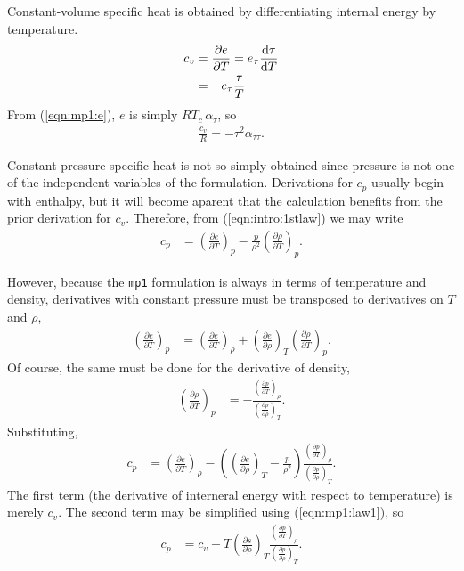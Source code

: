Constant-volume specific heat is obtained by differentiating internal energy by temperature.
\begin{align*}
c_v &= \frac{\partial e}{\partial T} = e_\tau \frac{\mathrm{d} \tau}{\mathrm{d} T}\\
 &= -e_\tau \frac{\tau}{T}
\end{align*}
From (\ref{eqn:mp1:e}), $e$ is simply $R T_c \, \alpha_\tau$, so
\begin{align}
\frac{c_v}{R} = - \tau^2 \alpha_{\tau\tau}\label{eqn:mp1:cv}.
\end{align}

Constant-pressure specific heat is not so simply obtained since pressure is not one of the independent variables of the formulation.  Derivations for $c_p$ usually begin with enthalpy, but it will become aparent that the calculation benefits from the prior derivation for $c_v$.  Therefore, from (\ref{eqn:intro:1stlaw}) we may write
\begin{align*}
c_p &= \left(\frac{\partial e}{\partial T}\right)_p - \frac{p}{\rho^2} \left(\frac{\partial \rho}{\partial T}\right)_p.
\end{align*}

However, because the \texttt{mp1} formulation is always in terms of temperature and density, derivatives with constant pressure must be transposed to derivatives on $T$ and $\rho$, 
\begin{align*}
\left(\frac{\partial e}{\partial T}\right)_p &=  \left(\frac{\partial e}{\partial T}\right)_\rho +  \left(\frac{\partial e}{\partial \rho}\right)_T  \left(\frac{\partial \rho}{\partial T}\right)_p.
\end{align*}
Of course, the same must be done for the derivative of density,
\begin{align*}
\left(\frac{\partial \rho}{\partial T}\right)_p &= -\frac{ \left(\frac{\partial p}{\partial T}\right)_\rho }{ \left(\frac{\partial p}{\partial \rho}\right)_T }.
\end{align*}
Substituting,
\begin{align*}
c_p &= \left(\frac{\partial e}{\partial T}\right)_\rho - \left(\left(\frac{\partial e}{\partial \rho}\right)_T - \frac{p}{\rho^2}\right) \frac{ \left(\frac{\partial p}{\partial T}\right)_\rho }{ \left(\frac{\partial p}{\partial \rho}\right)_T }.
\end{align*}
The first term (the derivative of interneral energy with respect to temperature) is merely $c_v$.  The second term may be simplified using (\ref{eqn:mp1:law1}), so
\begin{align*}
c_p &= c_v - T\left(\frac{\partial s}{\partial \rho}\right)_T \frac{ \left(\frac{\partial p}{\partial T}\right)_\rho }{ \left(\frac{\partial p}{\partial \rho}\right)_T }.
\end{align*}

